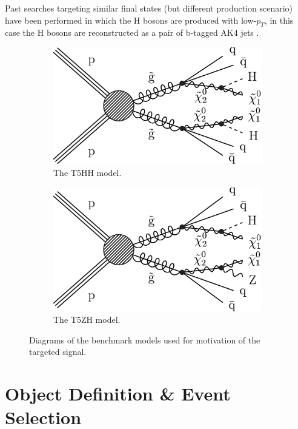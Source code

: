 Past searches targeting similar final states (but different production scenario) have been performed in which the H bosons are produced with low-$p_{T}$, in this case the H bosons are reconstructed as a pair of b-tagged AK4 jets \cite{CMS-SUS-16-044}.
 
\begin{figure}[htbp] 
\begin{subfigure}[b]{0.5\textwidth}
\centering
\includegraphics[width=\textwidth]{figs/SUS17006/CMS-SUS-17-006_Figure_001.pdf}
\caption{The T5HH model.}
\label{fig:t5hh}
\end{subfigure}
\begin{subfigure}[b]{0.5\textwidth}
\centering
\includegraphics[width=\textwidth]{figs/SUS17006/CMS-SUS-17-006_Figure-aux_001.pdf}
\caption{The T5ZH model.}
\end{subfigure}
\caption{Diagrams of the benchmark models used for motivation of the targeted signal.}
\label{fig:sms}
\end{figure}

\section{Object Definition \& Event Selection}

